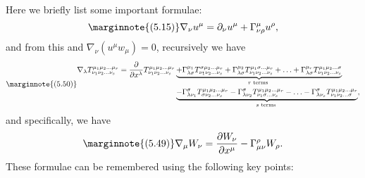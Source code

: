 \documentclass[hyperref, a4paper]{article}
\begin{document}
Here we briefly list some important formulae:
\begin{equation} \marginnote{(5.15)}
    \nabla_{\nu} u^{\mu}= \partial_\nu u^\mu +\Gamma_{\nu \rho}^{\mu} u^{\rho},
    \label{eq:u-derivative}
\end{equation}
and from this and $\nabla_\nu (u^\mu w_\mu) = 0$, recursively we have 
\begin{equation} \marginnote{(5.50)}
    \begin{aligned}
        \nabla_{\lambda} T_{\nu_{1} \nu_{2} \ldots \nu_{s}}^{\mu_{1} \mu_{2} \ldots \mu_{r}}=\frac{\partial}{\partial x^{\lambda}} T_{\nu_{1} \nu_{2} \ldots \nu_{s}}^{\mu_{1} \mu_{2} \ldots \mu_{r}}
        &\underbrace{+\Gamma_{\lambda \sigma}^{\mu_{1}} T_{\nu_{1} \nu_{2} \ldots \nu_{s}}^{\sigma \mu_{2} \ldots \mu_{r}}+\Gamma_{\lambda \sigma}^{\mu_{2}} T_{\nu_{1} \nu_{2} \ldots \nu_{s}}^{\mu_{1} \sigma \ldots \mu_{r}}+\ldots+\Gamma_{\lambda \sigma}^{\mu_{r}} T_{\nu_{1} \nu_{2} \ldots \nu_{s}}^{\mu_{1} \mu_{2} \ldots \sigma}}_{r \text { terms }} \\
        &\underbrace{-\Gamma_{\lambda \nu_{1}}^{\sigma} T_{\sigma \nu_{2} \ldots \nu_{s}}^{\mu_{1} \mu_{2} \ldots \mu_{r}}-\Gamma_{\lambda \nu_{2}}^{\sigma} T_{\nu_{1} \sigma \ldots \nu_{s}}^{\mu_{1} \mu_{2} \ldots \mu_{r}}-\ldots-\Gamma_{\lambda \nu_{s}}^{\sigma} T_{\nu_{1} \nu_{2} \ldots \sigma}^{\mu_{1} \mu_{2} \ldots \mu_{r}}}_{s \text { terms }},
        \end{aligned}
        \label{eq:multiple-index-derivative}
\end{equation}
and specifically, we have 
\begin{equation} \marginnote{(5.49)}
    \nabla_{\mu} W_{\nu}=\frac{\partial W_{\nu}}{\partial x^{\mu}}-\Gamma_{\mu \nu}^{\rho} W_{\rho}.
    \label{eq:w-derivative}
\end{equation}
These formulae can be remembered using the following key points:
\end{document}
